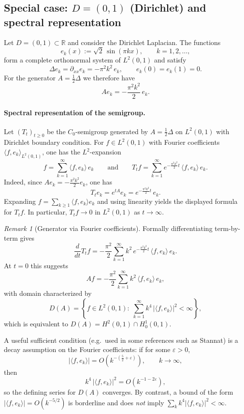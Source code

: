 \documentclass[11pt]{article}
\theoremstyle{definition}
\theoremstyle{remark}
\newtheorem{remark}{Remark}
\begin{document}
\subsection*{Special case: $D=(0,1)$ (Dirichlet) and spectral representation}

Let $D=(0,1)\subset \mathbb{R}$ and consider the Dirichlet Laplacian. The functions
\[
    e_k(x) := \sqrt{2}\,\sin(\pi k x),
    \qquad k=1,2,\dots,
\]
form a complete orthonormal system of $L^2(0,1)$ and satisfy
\[
    \Delta e_k = \partial_{xx} e_k = -\pi^2 k^2\, e_k,
    \qquad e_k(0)=e_k(1)=0.
\]
For the generator $A=\tfrac12\Delta$ we therefore have
\[
    A e_k = -\frac{\pi^2 k^2}{2}\,e_k.
\]

\paragraph{Spectral representation of the semigroup.}
Let $(T_t)_{t\ge 0}$ be the $C_0$-semigroup generated by $A=\tfrac12\Delta$ on $L^2(0,1)$ with Dirichlet boundary condition.
For $f\in L^2(0,1)$ with Fourier coefficients $\langle f,e_k\rangle_{L^2(0,1)}$, one has the $L^2$-expansion
	\[
	    f = \sum_{k=1}^{\infty} \langle f,e_k\rangle\,e_k
	    \qquad \text{and} \qquad
	    T_t f = \sum_{k=1}^{\infty} e^{-\frac{\pi^2 k^2}{2}t}\,\langle f,e_k\rangle\,e_k.
	\]
	Indeed, since $A e_k = -\frac{\pi^2 k^2}{2}e_k$, one has
	\[
	    T_t e_k = e^{tA}e_k = e^{-\frac{\pi^2 k^2}{2}t}\,e_k.
	\]
	Expanding $f=\sum_{k\ge 1}\langle f,e_k\rangle e_k$ and using linearity yields the displayed formula for $T_t f$.
	In particular, $T_t f \to 0$ in $L^2(0,1)$ as $t\to\infty$.

\begin{remark}[Generator via Fourier coefficients]
Formally differentiating term-by-term gives
\[
    \frac{d}{dt}T_t f
    =
    -\frac{\pi^2}{2}\sum_{k=1}^{\infty} k^2\,e^{-\frac{\pi^2 k^2}{2}t}\,\langle f,e_k\rangle\,e_k.
\]
At $t=0$ this suggests
\[
    Af = -\frac{\pi^2}{2}\sum_{k=1}^{\infty} k^2\,\langle f,e_k\rangle\,e_k,
\]
	with domain characterized by
	\[
	    D(A)
	    =
	    \left\{
	        f\in L^2(0,1):\;
	        \sum_{k=1}^{\infty} k^4\,|\langle f,e_k\rangle|^2 < \infty
	    \right\},
	\]
	which is equivalent to $D(A)=H^2(0,1)\cap H_0^1(0,1)$.

	A useful sufficient condition (e.g.\ used in some references such as Stannat) is a decay assumption on the Fourier coefficients:
	if for some $\varepsilon>0$,
	\[
	    |\langle f,e_k\rangle|
	    =
	    O\!\left(k^{-\left(\frac52+\varepsilon\right)}\right),
	    \qquad k\to\infty,
	\]
	then
	\[
	    k^4\,|\langle f,e_k\rangle|^2
	    =
	    O\!\left(k^{-1-2\varepsilon}\right),
	\]
	so the defining series for $D(A)$ converges.
	By contrast, a bound of the form $|\langle f,e_k\rangle|=O(k^{-5/2})$ is borderline and does \emph{not} imply $\sum_k k^4|\langle f,e_k\rangle|^2<\infty$.
	\end{remark}
\end{document}
